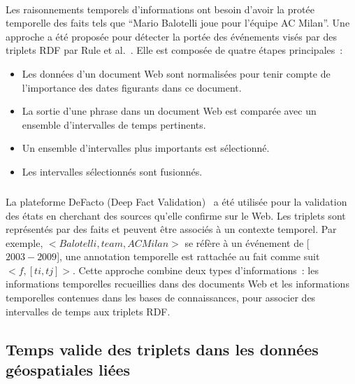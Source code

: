 \paragraph{}
Les raisonnements temporels d'informations ont besoin d'avoir la protée temporelle des faits tels que ``Mario Balotelli joue pour l'équipe AC Milan''.
Une approche a été proposée pour détecter la portée des événements visés par des triplets RDF par Rule et al.~\cite{rula2014}. Elle est composée de quatre étapes principales~:
\begin{itemize}
\item Les données d'un document Web sont normalisées pour tenir compte de l’importance des dates figurants dans ce document.
\item La sortie d'une phrase dans un document Web est comparée avec un ensemble d’intervalles de temps pertinents.
\item Un ensemble d’intervalles plus importants est sélectionné.
\item Les intervalles sélectionnés sont fusionnés.
\end{itemize}
\subparagraph{}
La plateforme DeFacto (Deep Fact Validation)~\cite{lehmann2012} a été utilisée pour la validation des états en cherchant des sources qu'elle confirme sur le Web.
Les triplets sont représentés par des faits et peuvent être associés à un contexte temporel.
Par exemple, $<Balotelli, team, AC Milan>$ se réfère à un événement de [$2003-2009$], une annotation temporelle est rattachée au fait comme suit $<f, [ti,tj]>$.
Cette approche combine deux types d'informations~: les informations temporelles recueillies dans des documents Web et les informations temporelles contenues dans les bases de connaissances, pour associer des intervalles de temps aux triplets RDF.
\subsection{Temps valide des triplets dans les données géospatiales liées}
